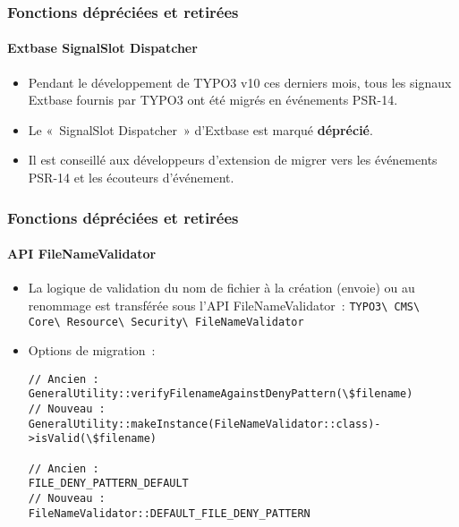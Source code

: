 \begin{frame}[fragile]
	\frametitle{Fonctions dépréciées et retirées}
	\framesubtitle{Extbase SignalSlot Dispatcher}

	\begin{itemize}
		\item Pendant le développement de TYPO3 v10 ces derniers mois,
			tous les signaux Extbase fournis par TYPO3 ont été migrés en événements PSR-14.
		\item Le «~SignalSlot Dispatcher~» d'Extbase est marqué \textbf{déprécié}.
		\item Il est conseillé aux développeurs d'extension de migrer vers les événements PSR-14
			et les écouteurs d'événement.
	\end{itemize}

\end{frame}


\begin{frame}[fragile]
	\frametitle{Fonctions dépréciées et retirées}
	\framesubtitle{API FileNameValidator}

	\lstset{basicstyle=\tiny\ttfamily}

	\begin{itemize}
		\item La logique de validation du nom de fichier à la création (envoie) ou
			au renommage est transférée sous l'API FileNameValidator~:
			\small
				\texttt{TYPO3\textbackslash
					CMS\textbackslash
					Core\textbackslash
					Resource\textbackslash
					Security\textbackslash
					FileNameValidator}
			\normalsize

		\item Options de migration~:
\begin{lstlisting}
// Ancien :
GeneralUtility::verifyFilenameAgainstDenyPattern(\$filename)
// Nouveau :
GeneralUtility::makeInstance(FileNameValidator::class)->isValid(\$filename)

// Ancien :
FILE_DENY_PATTERN_DEFAULT
// Nouveau :
FileNameValidator::DEFAULT_FILE_DENY_PATTERN
\end{lstlisting}

	\end{itemize}

\end{frame}


